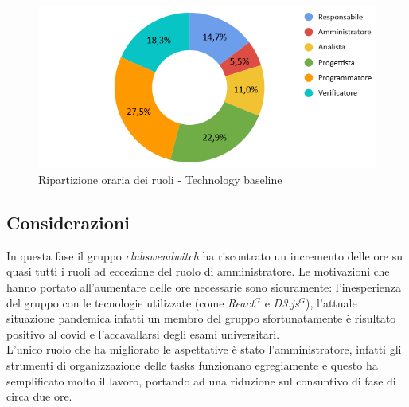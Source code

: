\begin{figure}[h!]
	\centering
	\includegraphics[scale=0.70]{../../assets/Diagrammi_Excel/torta_ore_TB.png}
	\caption{Ripartizione oraria dei ruoli - Technology baseline}
\end{figure}

\subsection{Considerazioni}
In questa fase il gruppo \textit{clubswendwitch} ha riscontrato un incremento delle ore su quasi tutti i ruoli ad eccezione del ruolo di amministratore. Le motivazioni che hanno portato all'aumentare delle ore necessarie sono sicuramente: l'inesperienza del gruppo con le tecnologie utilizzate (come \textit{React}$^{G}$ e \textit{D3.js}$^{G}$), l'attuale situazione pandemica infatti un membro del gruppo sfortunatamente è risultato positivo al covid e l'accavallarsi degli esami universitari.\\
L'unico ruolo che ha migliorato le aspettative è stato l'amministratore, infatti gli strumenti di organizzazione delle tasks funzionano egregiamente e questo ha semplificato molto il lavoro, portando ad una riduzione sul consuntivo di fase di circa due ore.

